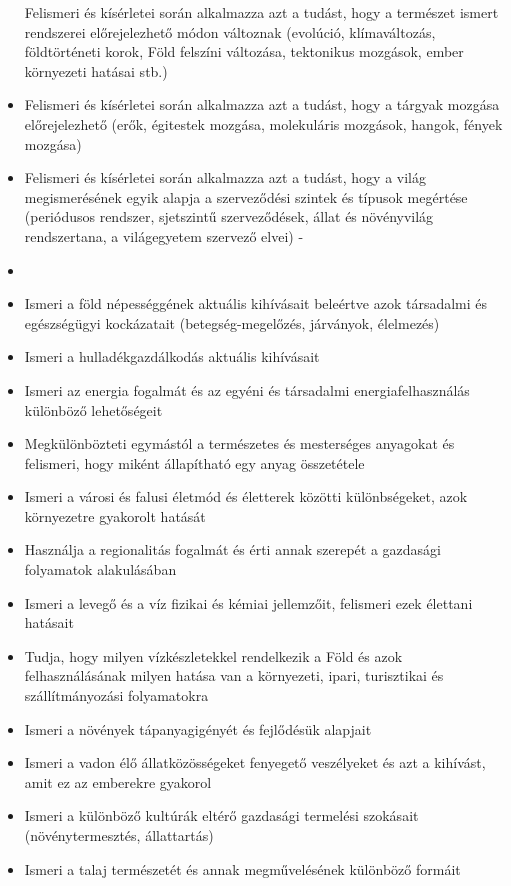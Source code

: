 \begin{itemize}
  Felismeri és kísérletei során alkalmazza azt a tudást, hogy a
  természet ismert rendszerei előrejelezhető módon változnak (evolúció,
  klímaváltozás, földtörténeti korok, Föld felszíni változása,
  tektonikus mozgások, ember környezeti hatásai stb.)
\item
  Felismeri és kísérletei során alkalmazza azt a tudást, hogy a tárgyak
  mozgása előrejelezhető (erők, égitestek mozgása, molekuláris mozgások,
  hangok, fények mozgása)
\item
  Felismeri és kísérletei során alkalmazza azt a tudást, hogy a világ
  megismerésének egyik alapja a szerveződési szintek és típusok
  megértése (periódusos rendszer, sjetszintű szerveződések, állat és
  növényvilág rendszertana, a világegyetem szervező elvei) -
\item
\item
  Ismeri a föld népességgének aktuális kihívásait beleértve azok
  társadalmi és egészségügyi kockázatait (betegség-megelőzés, járványok,
  élelmezés)
\item
  Ismeri a hulladékgazdálkodás aktuális kihívásait
\item
  Ismeri az energia fogalmát és az egyéni és társadalmi
  energiafelhasználás különböző lehetőségeit
\item
  Megkülönbözteti egymástól a természetes és mesterséges anyagokat és
  felismeri, hogy miként állapítható egy anyag összetétele
\item
  Ismeri a városi és falusi életmód és életterek közötti különbségeket,
  azok környezetre gyakorolt hatását
\item
  Használja a regionalitás fogalmát és érti annak szerepét a gazdasági
  folyamatok alakulásában
\item
  Ismeri a levegő és a víz fizikai és kémiai jellemzőit, felismeri ezek
  élettani hatásait
\item
  Tudja, hogy milyen vízkészletekkel rendelkezik a Föld és azok
  felhasználásának milyen hatása van a környezeti, ipari, turisztikai és
  szállítmányozási folyamatokra
\item
  Ismeri a növények tápanyagigényét és fejlődésük alapjait
\item
  Ismeri a vadon élő állatközösségeket fenyegető veszélyeket és azt a
  kihívást, amit ez az emberekre gyakorol
\item
  Ismeri a különböző kultúrák eltérő gazdasági termelési szokásait
  (növénytermesztés, állattartás)
\item
  Ismeri a talaj természetét és annak megművelésének különböző formáit

\end{itemize}
